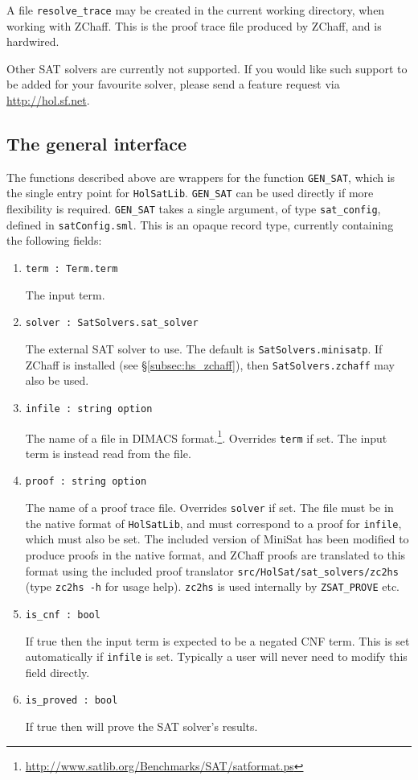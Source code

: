 A file \texttt{resolve\_trace} may be created in the current working directory, when working with ZChaff. This is the proof trace file produced by ZChaff, and is hardwired.

Other SAT solvers are currently not supported. If you would like such support to be added for your favourite solver, please send a feature request via \url{http://hol.sf.net}.

\subsection{The general interface}

The functions described above are wrappers for the function \texttt{GEN\_SAT}, which is the single entry point for {\tt{HolSatLib}}. \texttt{GEN\_SAT} can be used directly if more flexibility is required. \texttt{GEN\_SAT} takes a single argument, of type \texttt{sat\_config}, defined in \texttt{satConfig.sml}. This is an opaque record type, currently containing the following fields:

\begin{enumerate}
\item{\texttt{term : Term.term}}

The input term.
\item{\texttt{solver : SatSolvers.sat\_solver}}

The external SAT solver to use. The default is \texttt{SatSolvers.minisatp}. If ZChaff is installed (see \S\ref{subsec:hs_zchaff}), then \texttt{SatSolvers.zchaff} may also be used.
\item{\texttt{infile : string option}}

The name of a file in DIMACS format.\footnote{\url{http://www.satlib.org/Benchmarks/SAT/satformat.ps}}. Overrides \texttt{term} if set. The input term is instead read from the file.
\item{\texttt{proof : string option}}

The name of a proof trace file. Overrides \texttt{solver} if set. The file must be in the native format of {\tt{HolSatLib}}, and must correspond to a proof for \texttt{infile}, which must also be set. The included version of MiniSat has been modified to produce proofs in the native format, and ZChaff proofs are translated to this format using the included proof translator \texttt{src/HolSat/sat\_solvers/zc2hs} (type \texttt{zc2hs -h} for usage help). \texttt{zc2hs} is used internally by \texttt{ZSAT\_PROVE} etc.
\item{\texttt{is\_cnf : bool}}

If true then the input term is expected to be a negated CNF term. This is set automatically if \texttt{infile} is set. Typically a user will never need to modify this field directly.
\item{\texttt{is\_proved : bool}}

If true then \HOL{} will prove the SAT solver's results.
\end{enumerate}

